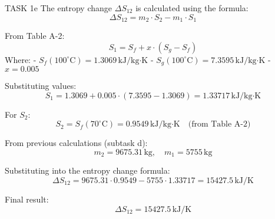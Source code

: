 TASK 1e  
The entropy change \( \Delta S_{12} \) is calculated using the formula:  
\[
\Delta S_{12} = m_2 \cdot S_2 - m_1 \cdot S_1
\]  

From Table A-2:  
\[
S_1 = S_f + x \cdot (S_g - S_f)
\]  
Where:  
- \( S_f(100^\circ\text{C}) = 1.3069 \, \text{kJ/kg·K} \)  
- \( S_g(100^\circ\text{C}) = 7.3595 \, \text{kJ/kg·K} \)  
- \( x = 0.005 \)  

Substituting values:  
\[
S_1 = 1.3069 + 0.005 \cdot (7.3595 - 1.3069) = 1.33717 \, \text{kJ/kg·K}
\]  

For \( S_2 \):  
\[
S_2 = S_f(70^\circ\text{C}) = 0.9549 \, \text{kJ/kg·K} \quad \text{(from Table A-2)}
\]  

From previous calculations (subtask d):  
\[
m_2 = 9675.31 \, \text{kg}, \quad m_1 = 5755 \, \text{kg}
\]  

Substituting into the entropy change formula:  
\[
\Delta S_{12} = 9675.31 \cdot 0.9549 - 5755 \cdot 1.33717 = 15427.5 \, \text{kJ/K}
\]  

Final result:  
\[
\Delta S_{12} = 15427.5 \, \text{kJ/K}
\]